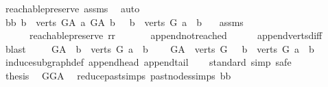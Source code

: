 \begin{isabellebody}
\ reachable{}{\isacharunderscore}{\kern0pt}preserve\ assms\ \isamarkupfalse%
\ auto\isanewline
\ \ \isamarkupfalse%
\ bb{\isacharcolon}{\kern0pt}\ {\isachardoublequoteopen}{\isacharbraceleft}{\kern0pt}b\ {\isasymin}\ verts\ G{\isacharunderscore}{\kern0pt}A{\isachardot}{\kern0pt}\ a\ {\isasymrightarrow}\isactrlsup {\isacharplus}{\kern0pt}\isactrlbsub G{\isacharunderscore}{\kern0pt}A\isactrlesub \ b{\isacharbraceright}{\kern0pt}\ {\isacharequal}{\kern0pt}\ \ {\isacharbraceleft}{\kern0pt}b\ {\isasymin}\ verts\ G{\isachardot}{\kern0pt}\ a\ {\isasymrightarrow}\isactrlsup {\isacharplus}{\kern0pt}\ b{\isacharbraceright}{\kern0pt}\ {\isachardoublequoteclose}\ \isamarkupfalse%
\ assms\ \isanewline
\ \ \ \ \ \ reachable{}{\isacharunderscore}{\kern0pt}preserve\ rr\ \isanewline
\ \ \ \ \isamarkupfalse%
\ append{\isacharunderscore}{\kern0pt}not{\isacharunderscore}{\kern0pt}reached\isanewline
\ \ \ \ \isamarkupfalse%
\ append{\isacharunderscore}{\kern0pt}verts{\isacharunderscore}{\kern0pt}diff{\isacharprime}{\kern0pt}\ \isamarkupfalse%
\ blast\ \isanewline
\ \ \isamarkupfalse%
\ {\isachardoublequoteopen}G{\isacharunderscore}{\kern0pt}A\ {\isasymrestriction}\ {\isacharbraceleft}{\kern0pt}b\ {\isasymin}\ verts\ G{\isachardot}{\kern0pt}\ a\ {\isasymrightarrow}\isactrlsup {\isacharplus}{\kern0pt}\ b{\isacharbraceright}{\kern0pt}\isanewline
\ \ \ {\isacharequal}{\kern0pt}\ {\isacharparenleft}{\kern0pt}G{\isacharunderscore}{\kern0pt}A\ {\isasymrestriction}\ verts\ G{\isacharparenright}{\kern0pt}\ \ {\isasymrestriction}\ {\isacharbraceleft}{\kern0pt}b\ {\isasymin}\ verts\ G{\isachardot}{\kern0pt}\ a\ {\isasymrightarrow}\isactrlsup {\isacharplus}{\kern0pt}\ b{\isacharbraceright}{\kern0pt}{\isachardoublequoteclose}\ \isanewline
\ \ \ \ \isamarkupfalse%
\ induce{\isacharunderscore}{\kern0pt}subgraph{\isacharunderscore}{\kern0pt}def\ append{\isacharunderscore}{\kern0pt}head\ append{\isacharunderscore}{\kern0pt}tail\ \isanewline
\ \ \isamarkupfalse%
{\isacharparenleft}{\kern0pt}standard{\isacharcomma}{\kern0pt}\ simp{\isacharcomma}{\kern0pt}\ safe{\isacharparenright}{\kern0pt}\ \isamarkupfalse%
\isanewline
\ \ \isamarkupfalse%
\ \isamarkupfalse%
\ {\isacharquery}{\kern0pt}thesis\ \isamarkupfalse%
\ GG{\isacharunderscore}{\kern0pt}A\ \isamarkupfalse%
\ reduce{\isacharunderscore}{\kern0pt}past{\isachardot}{\kern0pt}simps\ past{\isacharunderscore}{\kern0pt}nodes{\isachardot}{\kern0pt}simps\ bb\ \isamarkupfalse%

\end{isabellebody}
